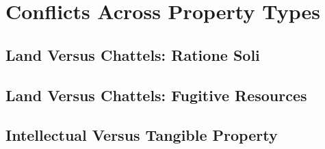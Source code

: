 \chapter{Conflicts Across Property Types}





\section{Land Versus Chattels: Ratione Soli}




\section{Land Versus Chattels: Fugitive Resources}









\begin{questions}

\end{questions}




\begin{questions}



\end{questions}


\section{Intellectual Versus Tangible Property}



\begin{questions}

\end{questions}
